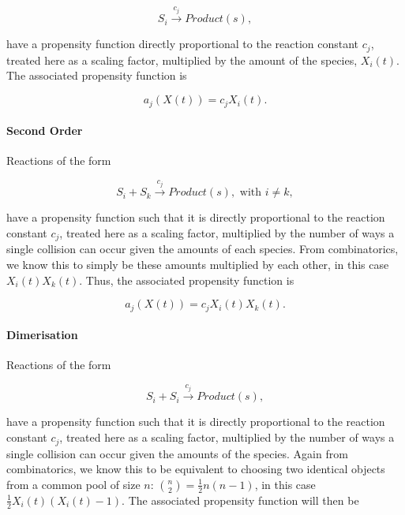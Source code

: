 \documentclass[ugrad,lot,lof,openright,11pt,oneside,onehalfspace]{RUthesis}
\begin{document}
				\begin{equation*}
				S_i \xrightarrow{c_j} Product(s),
				\end{equation*}

				\noindent
				have a propensity function directly proportional to the reaction constant $c_j$, treated here as a scaling factor, multiplied by the amount of the species, $X_i(t)$. The associated propensity function is

				\begin{equation*}
				a_j(X(t)) = c_jX_i(t).
				\end{equation*}

				\paragraph{Second Order} Reactions of the form

				\begin{equation*}
				S_i + S_k\xrightarrow{c_j} Product(s), \text{ with } i \neq k,
				\end{equation*}

				\noindent
				have a propensity function such that it is directly proportional to the reaction constant $c_j$, treated here as a scaling factor, multiplied by the number of ways a single collision can occur given the amounts of each species. From combinatorics, we know this to simply be these amounts multiplied by each other, in this case $X_i(t)X_k(t)$. Thus, the associated propensity function is

				\begin{equation*}
				a_j(X(t)) = c_jX_i(t)X_k(t).
				\end{equation*}

				\paragraph{Dimerisation} Reactions of the form

				\begin{equation*}
				S_i + S_i\xrightarrow{c_j} Product(s),
				\end{equation*}

				\noindent
				have a propensity function such that it is directly proportional to the reaction constant $c_j$, treated here as a scaling factor, multiplied by the number of ways a single collision can occur given the amounts of the species. Again from combinatorics, we know this to be equivalent to choosing two identical objects from a common pool of size $n$: $\binom{n}{2} = \frac{1}{2}n(n-1)$, in this case $\frac{1}{2}X_i(t)(X_i(t)-1)$. The associated propensity function will then be
\end{document}
